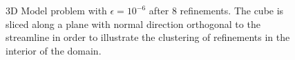 \begin{figure}[!h]
\centering
\caption{3D Model problem with $\epsilon = 10^{-6}$ after 8 refinements.  The cube is sliced along a plane with normal direction orthogonal to the streamline in order to illustrate the clustering of refinements in the interior of the domain.}
\label{fig:3D1e6}
\end{figure}

